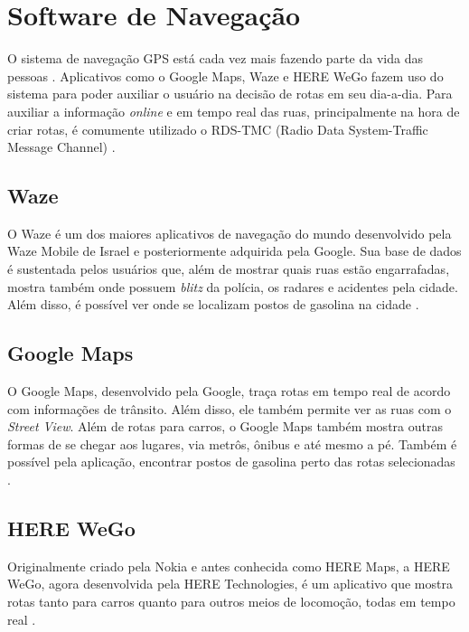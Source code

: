 \section{Software de Navegação}

O sistema de navegação GPS está cada vez mais fazendo parte da vida das pessoas \cite{gps-1}. Aplicativos como o Google Maps, Waze e HERE WeGo fazem uso do sistema para poder auxiliar o usuário na decisão de rotas em seu dia-a-dia. Para auxiliar a informação \textit{online} e em tempo real das ruas, principalmente na hora de criar rotas, é comumente utilizado o RDS-TMC (Radio Data System-Traffic Message Channel) \cite{rds-tmc}. 

\subsection{Waze}
O Waze é um dos maiores aplicativos de navegação do mundo desenvolvido pela Waze Mobile de Israel e posteriormente adquirida pela Google. Sua base de dados é sustentada pelos usuários que, além de mostrar quais ruas estão engarrafadas, mostra também onde possuem \textit{blitz} da polícia, os radares e acidentes pela cidade. Além disso, é possível ver onde se localizam postos de gasolina na cidade \cite{waze}.

\subsection{Google Maps}
O Google Maps, desenvolvido pela Google, traça rotas em tempo real de acordo com informações de trânsito. Além disso, ele também permite ver as ruas com o \textit{Street View}. Além de rotas para carros, o Google Maps também mostra outras formas de se chegar aos lugares, via metrôs, ônibus e até mesmo a pé. Também é possível pela aplicação, encontrar postos de gasolina perto das rotas selecionadas \cite{google-maps}. 

\subsection{HERE WeGo}
Originalmente criado pela Nokia e antes conhecida como HERE Maps, a HERE WeGo, agora desenvolvida pela HERE Technologies, é um aplicativo que mostra rotas tanto para carros quanto para outros meios de locomoção, todas em tempo real \cite{herewego}.
